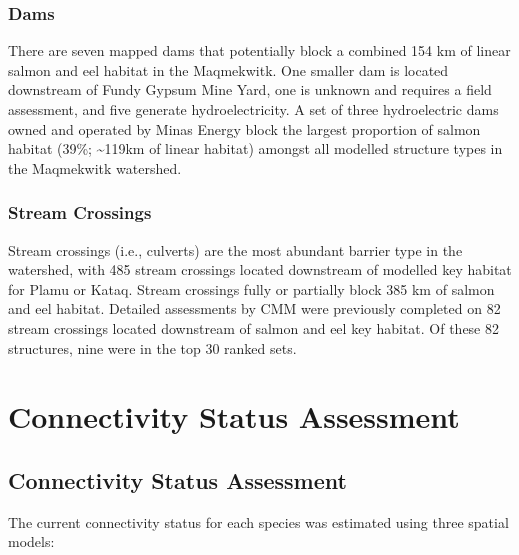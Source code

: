 \documentclass[
  letterpaper,
  DIV=11,
  numbers=noendperiod]{scrreprt}
\begin{document}
\subsection*{Dams}\label{dams}

There are seven mapped dams that potentially block a combined 154 km of
linear salmon and eel habitat in the Maqmekwitk. One smaller dam is
located downstream of Fundy Gypsum Mine Yard, one is unknown and
requires a field assessment, and five generate hydroelectricity. A set
of three hydroelectric dams owned and operated by Minas Energy block the
largest proportion of salmon habitat (39\%; \textasciitilde119km of
linear habitat) amongst all modelled structure types in the Maqmekwitk
watershed.

\subsection*{Stream Crossings}\label{stream-crossings}

Stream crossings (i.e., culverts) are the most abundant barrier type in
the watershed, with 485 stream crossings located downstream of modelled
key habitat for Plamu or Kataq. Stream crossings fully or partially
block 385 km of salmon and eel habitat. Detailed assessments by CMM were
previously completed on 82 stream crossings located downstream of salmon
and eel key habitat. Of these 82 structures, nine were in the top 30
ranked sets.


\chapter*{Connectivity Status
Assessment}\label{connectivity-status-assessment}


\section*{Connectivity Status
Assessment}\label{connectivity-status-assessment-1}


The current connectivity status for each species was estimated using
three spatial models:
\end{document}
